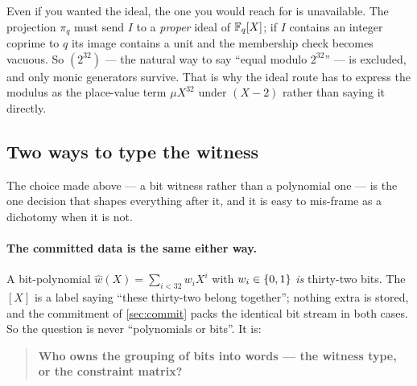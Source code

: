 \begin{remark}
Even if you wanted the ideal, the one you would reach for is unavailable. The
projection $\pi_q$ must send $I$ to a \emph{proper} ideal of $\mathbb{F}_q[X]$; if $I$
contains an integer coprime to $q$ its image contains a unit and the membership
check becomes vacuous. So $(2^{32})$ --- the natural way to say ``equal modulo
$2^{32}$'' --- is excluded, and only monic generators survive. That is why the
ideal route has to express the modulus as the place-value term $\mu X^{32}$
under $(X-2)$ rather than saying it directly.
\end{remark}

\subsection{Two ways to type the witness}\label{sec:typing}

The choice made above --- a bit witness rather than a polynomial one --- is the
one decision that shapes everything after it, and it is easy to mis-frame as a
dichotomy when it is not.

\paragraph{The committed data is the same either way.}
A bit-polynomial $\hat w(X)=\sum_{i<32}w_iX^i$ with $w_i\in\{0,1\}$ \emph{is}
thirty-two bits. The $[X]$ is a label saying ``these thirty-two belong
together''; nothing extra is stored, and the commitment of \cref{sec:commit}
packs the identical bit stream in both cases. So the question is never
``polynomials or bits''. It is:

\begin{quote}
\textbf{Who owns the grouping of bits into words --- the witness type, or the
constraint matrix?}
\end{quote}

